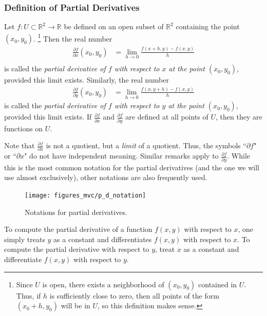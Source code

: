 \documentclass[12pt,letterpaper,reqno]{article}
\numberwithin{equation}{section}
\newcommand{\R}{\ensuremath{\mathbb R}}
\begin{document}
{\subsubsection{Definition of Partial Derivatives}
\begin{defn}
	Let $f:U \subset \R^2 \to \R$ be defined on an open subset of $\R^2$ containing the point $(x_0,y_0)$. \footnote{Since $U$ is open, there exists a neighborhood of $(x_0,y_0)$ contained in $U$. Thus, if $h$ is sufficiently close to zero, then all points of the form $(x_0+h,y_0)$ will be in $U$, so this definition makes sense.} Then the real number
	\begin{align*}
		\frac{\partial f}{\partial x}(x_0,y_0)&=\lim_{h \to 0}\frac{f(x+h,y)-f(x,y)}{h} \\
	\end{align*}
	is called the \emph{partial derivative of $f$ with respect to $x$ at the point $(x_0,y_0)$}, provided this limit exists. Similarly, the real number
	\begin{align*}
		\frac{\partial f}{\partial y}(x_0,y_0)&=\lim_{h \to 0}\frac{f(x,y+h)-f(x,y)}{h}
	\end{align*}
	is called the \emph{partial derivative of $f$ with respect to $y$ at the point $(x_0,y_0)$}, provided this limit exists. If $\frac{\partial f}{\partial x}$ and $\frac{\partial f}{\partial y}$ are defined at all points of $U$, then they are functions on $U$.
\end{defn}

\begin{remark}
Note that $\frac{\partial f}{\partial x}$ is not a quotient, but a \emph{limit} of a quotient. Thus, the symbols ``$\partial f$" or ``$\partial x$" do not have independent meaning. Similar remarks apply to $\frac{\partial f}{\partial y}$. While this is the most common notation for the partial derivatives (and the one we will use almost exclusively), other notations are also frequently used.
\end{remark}
\begin{figure}[h]
	\begin{center}
	\texttt{[image: figures\_mvc/p\_d\_notation]}
\end{center}
\caption{Notations for partial derivatives.}
\end{figure}
To compute the partial derivative of a function $f(x,y)$ with respect to $x$, one simply treats $y$ as a constant and differentiates $f(x,y)$ with respect to $x$. To compute the partial derivative with respect to $y$, treat $x$ as a constant and differentiate $f(x,y)$ with respect to $y$.

}
\end{document}
